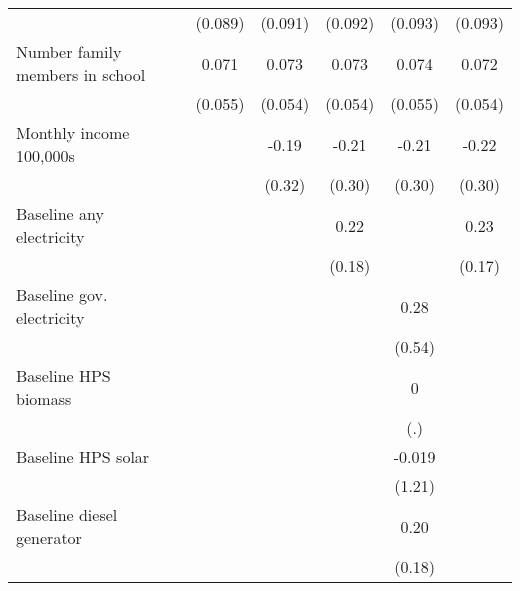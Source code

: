 \begin{table}[htbp]
\begin{tabular*}{1\hsize}{@{\hskip\tabcolsep\extracolsep\fill}l*{6}{c}}
                &                  &  (0.089)         &  (0.091)         &  (0.092)         &  (0.093)         &  (0.093)         \\
Number family members in school&                  &    0.071         &    0.073         &    0.073         &    0.074         &    0.072         \\
                &                  &  (0.055)         &  (0.054)         &  (0.054)         &  (0.055)         &  (0.054)         \\
Monthly income 100,000s&                  &                  &    -0.19         &    -0.21         &    -0.21         &    -0.22         \\
                &                  &                  &   (0.32)         &   (0.30)         &   (0.30)         &   (0.30)         \\
Baseline any electricity&                  &                  &                  &     0.22         &                  &     0.23         \\
                &                  &                  &                  &   (0.18)         &                  &   (0.17)         \\
Baseline gov. electricity&                  &                  &                  &                  &     0.28         &                  \\
                &                  &                  &                  &                  &   (0.54)         &                  \\
Baseline HPS biomass&                  &                  &                  &                  &        0         &                  \\
                &                  &                  &                  &                  &      (.)         &                  \\
Baseline HPS solar&                  &                  &                  &                  &   -0.019         &                  \\
                &                  &                  &                  &                  &   (1.21)         &                  \\
Baseline diesel generator&                  &                  &                  &                  &     0.20         &                  \\
                &                  &                  &                  &                  &   (0.18)         &                  \\

\end{tabular*}
\end{table}
